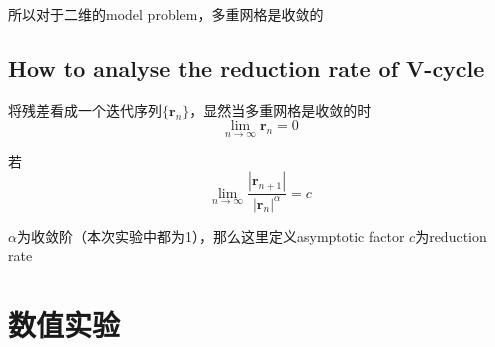 \documentclass{article}
\begin{document}
所以对于二维的model problem，多重网格是收敛的

\subsection{How to analyse the reduction rate of V-cycle}
将残差看成一个迭代序列$\{\mathbf{r}_n\}$，显然当多重网格是收敛的时$$\lim_{n\rightarrow \infty} \mathbf{r}_n=0$$

若
$$\lim_{n\rightarrow \infty}\frac{|\mathbf{r}_{n+1}|}{|\mathbf{r}_n|^{\alpha}} = c$$

$\alpha$为收敛阶（本次实验中都为1），那么这里定义asymptotic factor $c$为reduction rate

\section{数值实验}
\end{document}

